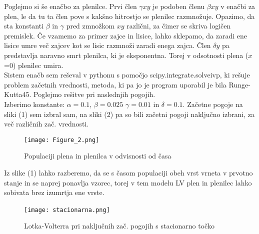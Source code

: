 \documentclass[11pt]{report}
\begin{document}
	Poglejmo si še enačbo za plenilce. Prvi člen $\gamma x y$ je podoben členu $\beta x y $ v enačbi za plen, le da tu ta člen pove s kakšno hitrostjo se plenilec razmnožuje. Opazimo, da sta konstanti $\beta$ in $\gamma$ pred zmnožkom $xy$ različni, za čimer se skriva logičen premislek. Če vzamemo za primer zajce in lisice, lahko sklepamo, da zaradi ene lisice umre več zajcev kot se lisic razmnoži zaradi enega zajca. Člen $\delta y $ pa predstavlja naravno smrt plenilca, ki je eksponentna. Torej v odsotnosti plena ($x$=0) plenilec umira.\\
	Sistem enačb sem reševal v pythonu s pomočjo scipy.integrate.solveivp, ki rešuje problem začetnih vrednosti, metoda, ki pa jo je program uporabil je bila Runge-Kutta45.
	Poglejmo rešitve pri naslednjih pogojih.\\
	Izberimo konstante: $\alpha = 0.1$, $\beta=0.025$ $\gamma=0.01$ in $\delta=0.1$.
	Začetne pogoje na sliki (1) sem izbral sam, na sliki (2) pa so bili začetni pogoji naključno izbrani, za več različnih zač. vrednosti.
	\begin{figure}[!ht]
		\centering
		\hspace{-35mm}
		\begin{minipage}{0.85\textwidth}
			\centering
			\vspace{-5mm}
			\texttt{[image: Figure\_2.png]}
			\hspace{60mm}
			\vspace{-5mm}
			\caption{Populaciji plena in plenilca v odvisnosti od časa}
		\end{minipage}
	\end{figure}
	Iz slike (1) lahko razberemo, da se s časom populaciji obeh vrst vrneta v prvotno stanje in se naprej ponavlja vzorec, torej v tem modelu LV plen in plenilec lahko sobivata brez izumrtja ene vrste.
	\newpage
	\vspace{4mm}
	\begin{figure}[!ht]
		\centering
		\hspace{-35mm}
		\vspace{6mm}
		\begin{minipage}{0.9\textwidth}
			\centering
			\vspace{-5mm}
			\texttt{[image: stacionarna.png]}
			\hspace*{5mm}
		~
			\vspace{-11mm}
			\caption{Lotka-Volterra pri naključnih zač. pogojih s stacionarno točko}
		\end{minipage}
	\end{figure}
\end{document}
